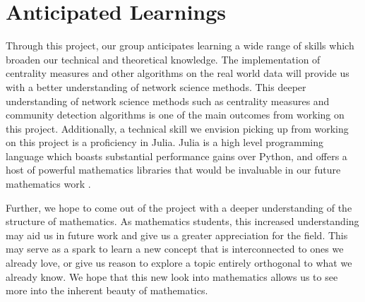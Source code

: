 \documentclass[10pt]{paper}
\begin{document}
\section{Anticipated Learnings}
Through this project, our group anticipates learning a wide range of skills which broaden our technical and theoretical knowledge. 
The implementation of centrality measures and other algorithms on the real world data will provide us with a better understanding of network science methods. 
This deeper understanding of network science methods such as centrality measures and community detection algorithms is one of the main outcomes from working on this project. 
Additionally, a technical skill we envision picking up from working on this project is a proficiency in Julia. 
Julia is a high level programming language \cite{bezanson2017julia} which boasts substantial performance gains over Python, and offers a host of powerful mathematics libraries that would be invaluable in our future mathematics work \cite{arya2022automatic, 10.1145/3511528.3511535, NetworkDynamics.jl-2021, DifferentialEquations.jl-2017, OceananigansJOSS}.

Further, we hope to come out of the project with a deeper understanding of the structure of mathematics. As mathematics students, this increased understanding may aid us in future work and give us a greater appreciation for the field. 
This may serve as a spark to learn a new concept that is interconnected to ones we already love, or give us reason to explore a topic entirely orthogonal to what we already know. We hope that this new look into mathematics allows us to see more into the inherent beauty of mathematics. 

\newpage 
\printbibliography
\end{document}
